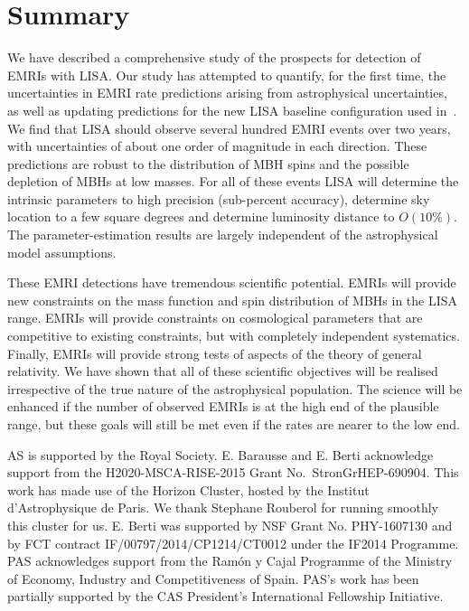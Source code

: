 \documentclass[a4paper]{jpconf}
\begin{document}
\section{Summary}
\label{sec:conc}
We have described a comprehensive study of the prospects for detection of EMRIs with LISA. Our study has attempted to quantify,  for the first time, the uncertainties in EMRI rate predictions arising from astrophysical uncertainties, as well as updating predictions for the new LISA baseline configuration used in~\cite{L3missprop}. We find that LISA should observe several hundred EMRI events over two years, with uncertainties of about one order of magnitude in each direction. These predictions are robust to the distribution of MBH spins and the possible depletion of MBHs at low masses. For all of these events LISA will determine the intrinsic parameters to high precision (sub-percent accuracy), determine sky location to a few square degrees and determine luminosity distance to $O(10\%)$. The parameter-estimation results are largely independent of the astrophysical model assumptions. 

These EMRI detections have tremendous scientific potential. EMRIs will provide new constraints on the mass function and spin distribution of MBHs in the LISA range. EMRIs  will provide constraints on cosmological parameters that are competitive to existing constraints, but with completely independent systematics. Finally, EMRIs will provide strong tests of aspects of the theory of general relativity. We have shown that all of these scientific objectives will be realised irrespective of the true nature of the astrophysical population. The science will be enhanced if the number of observed EMRIs is at the high end of the plausible range, but these goals will still be met even if the rates are nearer to the low end.

\ack AS is supported by the Royal Society. E. Barausse and E. Berti acknowledge support from the H2020-MSCA-RISE-2015 Grant No.\ StronGrHEP-690904. This work has made use of the Horizon Cluster, hosted by the Institut d'Astrophysique de Paris. We thank Stephane Rouberol for running smoothly this cluster for us. E. Berti was supported by NSF Grant No. PHY-1607130 and by FCT contract IF/00797/2014/CP1214/CT0012 under the IF2014 Programme. PAS acknowledges support from the Ram{\'o}n y Cajal Programme of the Ministry of Economy, Industry and Competitiveness of Spain. PAS's work has been partially supported by the CAS President's International Fellowship Initiative.
\end{document}
